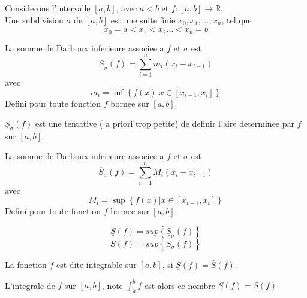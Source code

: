 \documentclass[../main.tex]{subfiles}
\begin{document}
\begin{defn}[Subdivisions]
	Considerons l'intervalle $[a,b]$, avec $a< b$ et $f: [ a,b]  \to \mathbb{R}$.\\
	Une subdivision $\sigma$ de $[a,b]$ est une suite finie $x_0, x_1, \ldots, x_n$, tel que
	\[ 
	x_0=a < x_1 < x_2 \ldots < x_n = b
	\]
	
\end{defn}
\begin{defn}
La somme de Darboux inferieure associee a $f$ et $\sigma$ est
\[ 
	\underline{S}_{\sigma} ( f)  = \sum_{i=1}^{ n}m_i ( x_i - x_{i-1} ) 
\]
avec 
\[ 
	m_i = \inf \left\{ f( x)  | x \in [ x_{i-1} ,x_i]  \right\} 
\]
Defini pour toute fonction $f$ bornee sur $[ a,b]$.
\end{defn}
$\underline{S}_{\sigma} ( f)$	est une tentative ( a priori trop petite) de definir l'aire determinee par $f$ sur $ [ a,b] $.

\begin{defn}
La somme de Darboux inferieure associee a $f$ et $\sigma$ est
\[ 
	\overline{S}_{\sigma} ( f)  = \sum_{i=1}^{ n}M_i ( x_i - x_{i-1} ) 
\]
avec 
\[ 
	M_i = \sup \left\{ f( x)  | x \in [ x_{i-1} ,x_i]  \right\} 
\]
Defini pour toute fonction $f$ bornee sur $[ a,b]$.
\end{defn}
\begin{defn}
	 \[ 
		 \underline{S}( f) = sup \left\{ \underline{S}_{\sigma} ( f)  \right\} 
	\]
	\[ 
		 \overline{S}( f) = sup \left\{ \overline{S}_{\sigma} ( f)  \right\} 
	\]
	
	
\end{defn}
\begin{defn}
	La fonction $f$ est dite integrable sur $[a,b]$, si $\underline{S}( f) = \overline{S}( f) $.
\end{defn}
L'integrale de $f$ sur $[a,b]$, note $ \int_{ a }^{ b } f$ est alors ce nombre $\underline{S}( f) = \overline{S}( f)$
\end{document}
